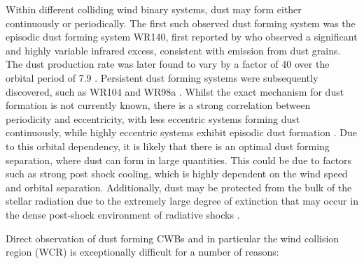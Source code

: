 \documentclass[fleqn,usenatbib]{mnras}
\begin{document}
Within different colliding wind binary systems, dust may form either continuously or periodically.
The first such observed dust forming system was the episodic dust forming system WR140, first reported by \cite{williamsMultifrequencyVariationsWolfrayet1990} who observed a significant and highly variable infrared excess, consistent with emission from dust grains.
The dust production rate was later found to vary by a factor of 40 over the orbital period of  \SI{7.9}{\year} \citep{van1999wolf,thomasOrbitStellarMasses2021}.
Persistent dust forming systems were subsequently discovered, such as WR104 \citep{tuthill_dusty_1999} and WR98a
\citep{monnierPinwheelNebulaWR1999}.
Whilst the exact mechanism for dust formation is not currently known, there is a strong correlation between periodicity and eccentricity, with less eccentric systems forming dust continuously, while highly eccentric systems exhibit episodic dust formation
\citep{crowther_dust_2003}.
Due to this orbital dependency, it is likely that there is an optimal dust forming separation, where dust can form in large quantities. This could be due to factors such as strong post shock cooling, which is highly dependent on the wind speed and orbital separation.
Additionally, dust may be protected from the bulk of the stellar radiation due to the extremely large degree of extinction that may occur in the dense post-shock environment of radiative shocks \citep{cherchneffDustFormationCarbonrich2015}.


Direct observation of dust forming CWBs and in particular the wind collision region (WCR) is exceptionally difficult for a number of reasons:
\end{document}
